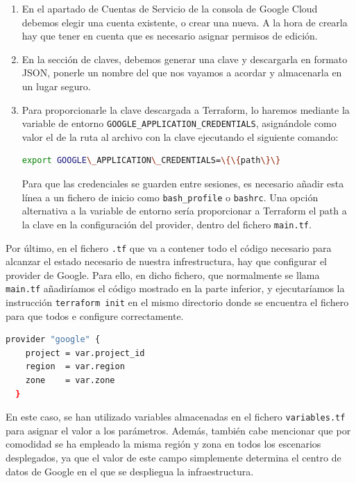   \begin{enumerate}
    \item En el apartado de Cuentas de Servicio de la consola de Google Cloud debemos elegir una cuenta existente, o crear una nueva. A la hora de crearla hay que tener en cuenta que es necesario asignar permisos de edición.
    \item En la sección de claves, debemos generar una clave y descargarla en formato JSON, ponerle un nombre del que nos vayamos a acordar y almacenarla en un lugar seguro. 
    \item Para proporcionarle la clave descargada a Terraform, lo haremos mediante la variable de entorno \texttt{GOOGLE\_APPLICATION\_CREDENTIALS}, asignándole como valor el de la ruta al archivo con la clave ejecutando el siguiente comando:

      \begin{lstlisting}[language=Bash]
	export GOOGLE\_APPLICATION\_CREDENTIALS=\{\{path\}\}\end{lstlisting}

      Para que las credenciales se guarden entre sesiones, es necesario añadir esta línea a un fichero de inicio como \texttt{bash\_profile} o \texttt{bashrc}. Una opción alternativa a la variable de entorno sería proporcionar a Terraform el path a la clave en la configuración del provider, dentro del fichero \texttt{main.tf}.
  \end{enumerate}

  Por último, en el fichero \texttt{.tf} que va a contener todo el código necesario para alcanzar el estado necesario de nuestra infrestructura, hay que configurar el provider de Google. Para ello, en dicho fichero, que normalmente se llama \texttt{main.tf} añadiríamos el código mostrado en la parte inferior, y ejecutaríamos la instrucción \texttt{terraform init} en el mismo directorio donde se encuentra el fichero para que todos e configure correctamente. 

  \begin{lstlisting}[language=Bash]
  provider "google" {
    project = var.project_id
    region  = var.region
    zone    = var.zone
  }\end{lstlisting}

  En este caso, se han utilizado variables almacenadas en el fichero \texttt{variables.tf} para asignar el valor a los parámetros. Además, también cabe mencionar que por comodidad se ha empleado la misma región y zona en todos los escenarios desplegados, ya que el valor de este campo simplemente determina el centro de datos de Google en el que se despliegua la infraestructura.

